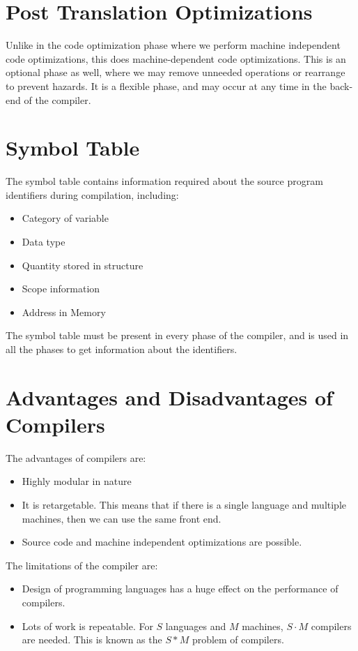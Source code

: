 \documentclass[12pt,letterpaper]{amsbook}
\theoremstyle{definition}
\begin{document}
\section{Post Translation Optimizations}

Unlike in the code optimization phase where we perform machine independent code optimizations, this does machine-dependent code optimizations. This is an optional phase as well, where we may remove unneeded operations or rearrange to prevent hazards. It is a flexible phase, and may occur at any time in the back-end of the compiler.

\section{Symbol Table}

The symbol table contains information required about the source program identifiers during compilation, including:

\begin{itemize}
  \item Category of variable
  \item Data type
  \item Quantity stored in structure
  \item Scope information
  \item Address in Memory
\end{itemize}

The symbol table must be present in every phase of the compiler, and is used in all the phases to get information about the identifiers.

\section{Advantages and Disadvantages of Compilers}

The advantages of compilers are:

\begin{itemize}
  \item Highly modular in nature
  \item It is retargetable. This means that if there is a single language and multiple machines, then we can use the same front end.
  \item Source code and machine independent optimizations are possible.
\end{itemize}

The limitations of the compiler are:

\begin{itemize}
  \item Design of programming languages has a huge effect on the performance of compilers.
  \item Lots of work is repeatable. For $S$ languages and $M$ machines, $S\cdot M$ compilers are needed. This is known as the $S*M$ problem of compilers.
\end{itemize}
\end{document}
